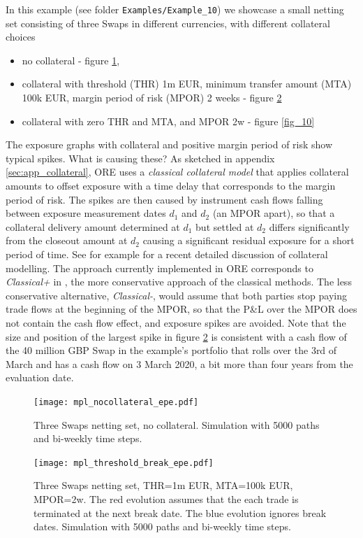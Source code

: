 \documentclass[12pt, a4paper]{article}
\begin{document}
In this example (see folder {\tt Examples/Example\_10}) we showcase a small netting set consisting of three Swaps in
different currencies, with different collateral choices
\begin{itemize}
\item no collateral - figure \ref{fig_8},
\item collateral with threshold (THR) 1m EUR, minimum transfer amount (MTA) 100k EUR, margin period of risk (MPOR) 2
  weeks - figure \ref{fig_9}
\item collateral with zero THR and MTA, and MPOR 2w - figure \ref{fig_10}
\end{itemize}
The exposure graphs with collateral and positive margin period of risk show typical spikes. What is causing these? As
sketched in appendix \ref{sec:app_collateral}, ORE uses a {\em classical collateral model} that applies collateral
amounts to offset exposure with a time delay that corresponds to the margin period of risk. The spikes are then caused
by instrument cash flows falling between exposure measurement dates $d_1$ and $d_2$ (an MPOR apart), so that a
collateral delivery amount determined at $d_1$ but settled at $d_2$ differs significantly from the closeout amount at
$d_2$ causing a significant residual exposure for a short period of time. See for example \cite{Andersen2016} for a
recent detailed discussion of collateral modelling. The approach currently implemented in ORE corresponds to {\em
  Classical+} in \cite{Andersen2016}, the more conservative approach of the classical methods. The less conservative
alternative, {\em Classical-}, would assume that both parties stop paying trade flows at the beginning of the MPOR, so
that the P\&L over the MPOR does not contain the cash flow effect, and exposure spikes are avoided. Note that the size
and position of the largest spike in figure \ref{fig_9} is consistent with a cash flow of the 40 million GBP Swap in the
example's portfolio that rolls over the 3rd of March and has a cash flow on 3 March 2020, a bit more than four years
from the evaluation date.
  
\begin{figure}[h!]
\begin{center}
\texttt{[image: mpl\_nocollateral\_epe.pdf]}
\end{center}
\caption{Three Swaps netting set, no collateral. Simulation with 5000 paths and bi-weekly time steps.}
\label{fig_8}
\end{figure}

\begin{figure}[htb]
\begin{center}
\texttt{[image: mpl\_threshold\_break\_epe.pdf]}
\end{center}
\caption{Three Swaps netting set, THR=1m EUR, MTA=100k EUR, MPOR=2w. The red evolution assumes that the each trade is
  terminated at the next break date. The blue evolution ignores break dates. Simulation with 5000 paths and bi-weekly
  time steps.}
\label{fig_9}
\end{figure}
\end{document}
